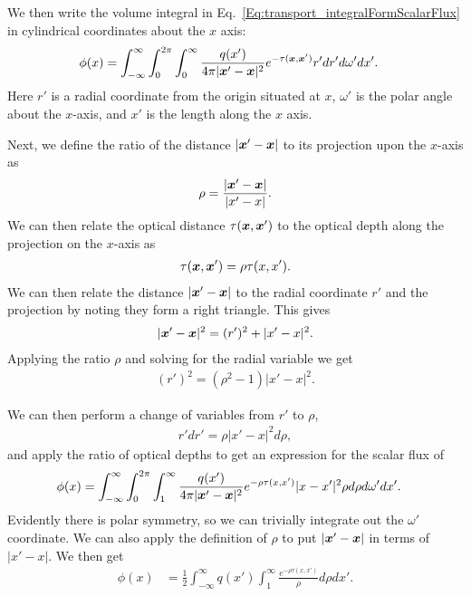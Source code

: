 We then write the volume integral in Eq.~\eqref{Eq:transport_integralFormScalarFlux} in cylindrical coordinates about the $x$ axis:
\begin{align}
  \phi(x) 
  &= \int_{-\infty}^\infty \int_0^{2\pi} \int_0^\infty \frac{q( x' ) }{4\pi | \bm{x}' - \bm{x} |^2 } e^{-\tau(\bm{x},\bm{x}')} r' dr' d\omega' dx'.
\end{align}
Here $r'$ is a radial coordinate from the origin situated at $x$, $\omega'$ is the polar angle about the $x$-axis, and $x'$ is the length along the $x$ axis.

Next, we define the ratio of the distance $| \bm{x}' - \bm{x} |$ to its projection upon the $x$-axis as
\begin{align}
  \rho = \frac{ | \bm{x}' - \bm{x} | }{ | x' - x | } .
\end{align}
We can then relate the optical distance $\tau(\bm{x},\bm{x}')$ to the optical depth along the projection on the $x$-axis as
\begin{align}
  \tau(\bm{x},\bm{x}') = \rho \tau(x,x') .
\end{align}
We can then relate the distance $| \bm{x}' - \bm{x} |$ to the radial coordinate $r'$ and the projection by noting they form a right triangle. This gives
\begin{align}
  | \bm{x}' - \bm{x} |^2 = ( r' )^2 + | x' - x |^2 .
\end{align}
Applying the ratio $\rho$ and solving for the radial variable we get
\begin{align}
  ( r' )^2 = ( \rho^2 - 1 ) | x' - x |^2 .
\end{align}

We can then perform a change of variables from $r'$ to $\rho$,
\begin{align}
  r' dr' = \rho | x' - x |^2  d\rho ,
\end{align}
and apply the ratio of optical depths to get an expression for the scalar flux of
\begin{align}
  \phi(x) 
  &= \int_{-\infty}^\infty \int_0^{2\pi} \int_1^\infty \frac{q( x' ) }{4\pi | \bm{x}' - \bm{x} |^2 } e^{-\rho \tau(x,x')} | x - x' |^2 \rho d\rho d\omega' dx'.
\end{align}
Evidently there is polar symmetry, so we can trivially integrate out the $\omega'$ coordinate. We can also apply the definition of $\rho$ to put $|\bm{x}' - \bm{x}|$ in terms of $|x' - x|$. We then get
\begin{align}
  \phi(x) 
  &= \frac{1}{2} \int_{-\infty}^\infty q(x') \int_1^\infty  \frac{e^{-\rho \tau(x,x')}}{\rho}  d\rho  dx'.
\end{align}

